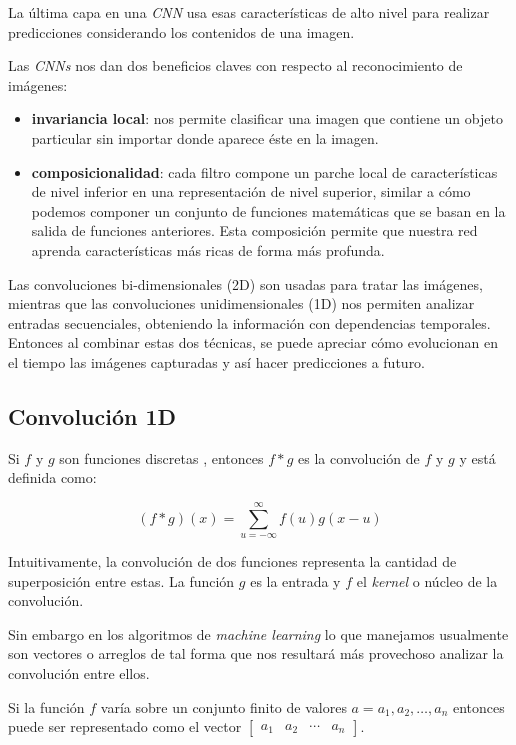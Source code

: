\documentclass[a4paper,12pt]{article}
\begin{document}
La última capa en una \textit{CNN} usa esas características de alto nivel para realizar predicciones considerando los contenidos de una imagen.

Las \textit{CNNs} nos dan dos beneficios claves con respecto al reconocimiento de imágenes:
\begin{itemize}[noitemsep, topsep=2pt]
	\item \textbf{invariancia local}: nos permite clasificar una imagen que contiene un objeto particular sin importar donde aparece éste en la imagen.
	\item \textbf{composicionalidad}: cada filtro compone un parche local de características de nivel inferior en una representación de nivel superior, similar a cómo podemos componer un conjunto de funciones matemáticas que se basan en la salida de funciones anteriores. Esta composición permite que nuestra red aprenda características más ricas de forma más profunda.
	      	      
\end{itemize}

Las convoluciones bi-dimensionales (2D) son usadas para tratar las imágenes, mientras que las convoluciones unidimensionales (1D) nos permiten analizar entradas secuenciales, obteniendo la información con dependencias temporales. Entonces al combinar estas dos técnicas, se puede apreciar cómo evolucionan en el tiempo las imágenes capturadas y así hacer predicciones a futuro.

\subsection{Convolución 1D}
Si $f$ y $g$ son funciones discretas \citep{keller}, entonces $f * g$ es la convolución de $f$ y $g$ y está definida como:

$$(f*g)(x)=\sum_{u=-\infty}^{\infty} f(u)g(x-u)$$

Intuitivamente, la convolución de dos funciones representa la cantidad de superposición entre estas. La función $g$ es la entrada y $f$ el \textit{kernel} o núcleo de la convolución.

Sin embargo en los algoritmos de \textit{machine learning} lo que manejamos usualmente son vectores o arreglos de tal forma que nos resultará más provechoso analizar la convolución entre ellos.

Si la función $f$ varía sobre un conjunto finito de valores $a = a_1, a_2, \dots, a_n$ entonces puede ser representado como el vector 
$\begin{bmatrix} a_1 & a_2 & \cdots & a_n \end{bmatrix}$.
\end{document}
